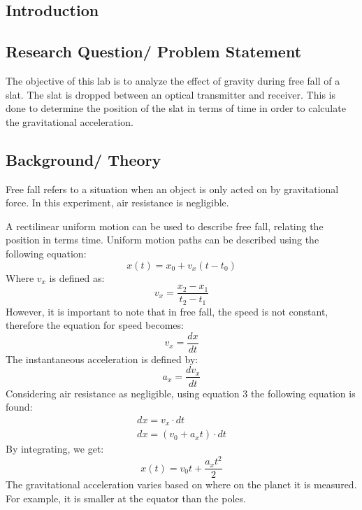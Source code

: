 \documentclass[a4paper]{article}
\begin{document}
\begin{justify}

\section{Introduction}
\subsection{Research Question/ Problem Statement}
The objective of this lab is to analyze the effect of gravity during free fall
of a slat. The slat is dropped between an optical transmitter and receiver. This
is done to determine the position of the slat in terms of time in order to
calculate the gravitational acceleration.

\subsection{Background/ Theory}
Free fall refers to a situation when an object is only acted on by gravitational
force. In this experiment, air resistance is negligible.

\noindent
A rectilinear uniform motion can be used to describe free fall, relating the
position in terms time. Uniform motion paths can be described using the
following equation:
\begin{equation}
    x(t) = x_0 + v_x(t-t_0)
\end{equation} 
Where $v_x$ is defined as:
\begin{equation}
    v_x = \frac{x_2 - x_1}{t_2 - t_1}
\end{equation}
However, it is important to note that in free fall, the speed is not constant,
therefore the equation for speed becomes:
\begin{equation}
    v_x = \frac{dx}{dt}
\end{equation}
The instantaneous acceleration is defined by:
\begin{equation}
    a_x = \frac{dv_x}{dt}
\end{equation}
Considering air resistance as negligible, using equation 3 the following
equation is found:
\begin{gather}
    dx = v_x \cdot dt \\
    dx = (v_0 +a_x t) \cdot dt \nonumber
\end{gather}
By integrating, we get:
\begin{equation}
    x(t) = v_0 t + \frac{a_x t^2}{2}
\end{equation}
The gravitational acceleration varies based on where on the planet it is
measured. For example, it is smaller at the equator than the poles.


\end{justify}
\end{document}
